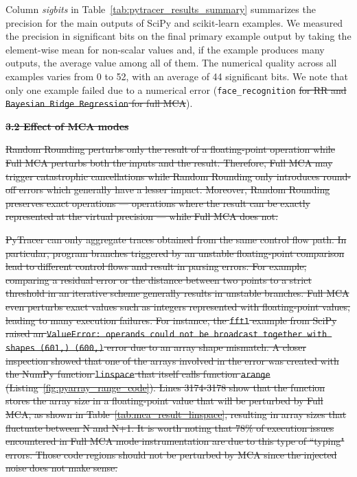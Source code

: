 \documentclass[10pt,journal,compsoc]{IEEEtran}
\newcommand{\pytracer}[0]{PyTracer\xspace}
\DeclareRobustCommand{\remove}[1]{\textcolor{lightred}{\sout{#1}}}
\begin{document}
Column \textit{sigbits} in Table~\ref{tab:pytracer_results_summary} summarizes
the precision for the main outputs of SciPy and scikit-learn examples. We
measured the precision in significant bits on the final primary example output
by taking the element-wise mean for non-scalar values and, if the example
produces many outputs, the average value among all of them. The numerical
quality across all examples varies from 0 to 52, with an average of 44
significant bits. We note that only one example failed due to a
numerical error (\texttt{face\_recognition}
\remove{for RR and \texttt{Bayesian Ridge Regression} for full MCA}).

\noindent \remove{\textbf{3.2 Effect of MCA modes}}

\remove{
    Random Rounding perturbs only the result of a floating-point operation while
    Full MCA perturbs both the inputs and the result. Therefore, Full MCA may
    trigger catastrophic cancellations while Random Rounding only introduces
    round-off errors which generally have a lesser impact. Moreover, Random Rounding
    preserves exact operations --- operations where the result can be exactly
    represented at the virtual precision --- while Full MCA does not.}

\remove{\pytracer can only aggregate traces obtained from the same control flow path. In
    particular, program branches triggered by an unstable floating-point comparison
    lead to different control flows and result in parsing errors. For example,
    comparing a residual error or the distance between two points to a strict
    threshold in an iterative scheme generally results in unstable branches. Full
    MCA even perturbs exact values such as integers represented with floating-point
    values, leading to many execution failures. For instance, the \texttt{fft1}
    example from SciPy raised an \texttt{ValueError: operands could not be broadcast
        together with shapes (601,) (600,)} error due to an array shape mismatch. A
    closer inspection showed that one of the arrays involved in the error was
    created with the NumPy function \texttt{linspace} that itself calls function
    \texttt{arange} (Listing~\ref{fig:pyarray_range_code}). Lines 3174-3178 show
    that the function stores the array size in a floating-point value that will be
    perturbed by Full MCA, as shown in Table~\ref{tab:mca_result_linspace},
    resulting in array sizes that fluctuate between N and N+1. It is worth noting
    that 78\% of execution issues encountered in Full MCA mode instrumentation are
    due to this type of ``typing" errors.  
    Those code regions should not be perturbed by MCA since the injected noise does
    not make sense.}
\end{document}

